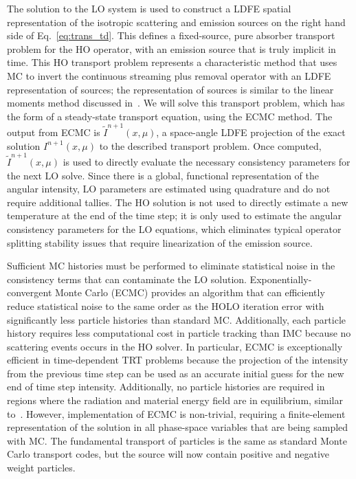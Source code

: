 The solution to the LO system is used to construct a LDFE spatial representation of
the isotropic scattering and emission sources on the right hand side of
Eq.~\eqref{eq:trans_td}.    This defines a fixed-source, pure absorber
transport problem for the HO operator, with an emission source that is truly implicit in
time. This HO transport problem represents a characteristic method that uses MC to
invert the continuous streaming plus removal operator with an LDFE representation of
sources; the representation of sources is similar to the linear moments method
discussed in~\cite{larsen_error}.  We will solve this transport problem, which has
the form of a steady-state transport equation, using the ECMC method.  The output from ECMC is
$\tilde{I}^{n+1}(x,\mu)$, a space-angle LDFE projection of the exact solution
$I^{n+1}(x,\mu)$ to the described transport problem.  Once computed, $\tilde{I}^{n+1}(x,\mu)$ is used
to directly evaluate the necessary consistency parameters for the next LO solve.  Since there is a global, functional representation of
the angular intensity,  LO parameters are estimated using quadrature and do not
require additional tallies.  The HO solution is not used to directly estimate a new
temperature at the end of the time step; it is
only used to estimate the angular consistency parameters for the LO equations, which eliminates
typical operator splitting stability issues that require linearization of the emission source.

Sufficient MC histories must be performed to eliminate statistical
noise in the consistency terms that can contaminate the LO solution.
Exponentially-convergent Monte Carlo (ECMC)\cite{jake,ans_2014} provides an algorithm that can efficiently
reduce statistical noise to the same order as the HOLO iteration error with
significantly less particle histories than standard MC.  Additionally, each particle
history requires less computational cost in particle tracking than IMC because no
scattering events occurs in the HO solver. In particular, ECMC is
exceptionally efficient in time-dependent TRT problems because the projection of the
intensity from the previous time step can be used as an accurate initial guess for
the new end of time step intensity. Additionally, no particle histories are required
in regions where the radiation and material energy field are in equilibrium, similar to~\cite{rmc}.  However, implementation
of ECMC is non-trivial, requiring a finite-element representation of the solution in
all phase-space variables that are being sampled with MC.  The fundamental transport of particles is the same
as standard Monte Carlo transport codes, but the source will now contain positive and
negative weight particles.

